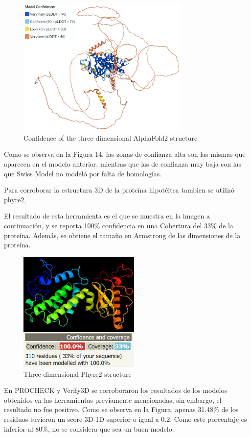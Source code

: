 \documentclass[journal,transmag]{IEEEtran}
\begin{document}
\begin{figure}[!h]
	\center
	\includegraphics[width=8.5cm]{imagenes/alpha2.png}
	\caption{Confidence of the three-dimensional AlphaFold2 structure}
	\label{14}
\end{figure}
Como se observa en la Figura 14, las zonas de confianza alta son las mismas que aparecen en el modelo anterior, mientras que las de confianza muy baja son las que Swiss Model no modeló por falta de homologías.  

Para corroborar la estructura 3D de la proteína hipotéitca tambien se utilizó phyre2, 

El resultado de esta herramienta es el que se muestra en la imagen a continuación, y se reporta 100\% confidencia en una Cobertura del 33\% de la proteína. Además, se obtiene el tamaño en Armstrong de las dimensiones de la proteína.

\begin{figure}[!h]
	\center
	\includegraphics[width=6cm]{imagenes/phyre.JPG}
	\caption{Three-dimensional Phyre2 structure}
	\label{15}
\end{figure}

En PROCHECK y Verify3D se corroboraron los resultados de los modelos obtenidos en las herramientas previamente mencionadas, sin embargo, el resultado no fue positivo. Como se observa en la Figura, apenas 31.48\% de los residuos tuvieron un score 3D-1D superior o igual a 0.2. Como este porcentaje es inferior al 80\%, no se considera que sea un buen modelo.  
\end{document}
